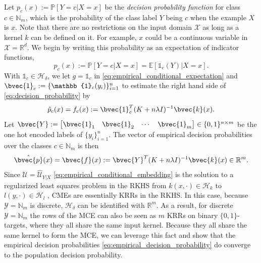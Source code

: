 \documentclass{llncs}
\begin{document}
	Let $p_{c}(x) := \mathbb{P}[Y = c | X = x]$ be the \textit{decision probability function} for class $c \in \mathbb{N}_{m}$, which is the probability of the class label $Y$ being $c$ when the example $X$ is $x$. Note that there are no restrictions on the input domain $\mathcal{X}$ as long as a kernel $k$ can be defined on it. For example, $x$ could be a continuous variable in $\mathcal{X} = \mathbb{R}^{d}$. We begin by writing this probability as an expectation of indicator functions,
	\begin{equation}
	p_{c}(x) := \mathbb{P}[Y = c | X = x] = \mathbb{E}[\mathbb{1}_{c}(Y) | X = x].
	\label{eq:decision_probability}
	\end{equation}	
	With $\mathbb{1}_{c} \in \mathcal{H}_{\delta}$, we let $g = \mathbb{1}_{c}$ in \eqref{eq:empirical_conditional_expectation} and $\bvec{1}_{c} := \{\mathbb{1}_{c}(y_{i})\}_{i = 1}^{n}$ to estimate the right hand side of \eqref{eq:decision_probability} by
	\begin{equation}
	\hat{p}_{c}(x) = f_{c}(x) := \bvec{1}_{c}^{T} (K + n \lambda I)^{-1} \bvec{k}(x).
	\label{eq:empirical_decision_probability}
	\end{equation}
	Let $\bvec{Y} := \begin{bmatrix} \bvec{1}_{1} & \bvec{1}_{2} & \cdots & \bvec{1}_{m} \end{bmatrix} \in \{0, 1\}^{n \times m}$ be the one hot encoded labels of $\{y_{i}\}_{i = 1}^{n}$. The vector of empirical decision probabilities over the classes $c \in \mathbb{N}_{m}$ is then
	\begin{equation}
	\hat{\bvec{p}}(x) = \bvec{f}(x) := \bvec{Y}^{T} (K + n \lambda I)^{-1} \bvec{k}(x) \in \mathbb{R}^{m}.
	\label{eq:empirical_decision_probability_vector}
	\end{equation}
	Since $\mathcal{U} = \hat{\mathcal{U}}_{Y | X}$ \eqref{eq:empirical_conditional_embedding} is the solution to a regularized least squares problem in the RKHS from $k(x, \cdot) \in \mathcal{H}_{k}$ to $l(y, \cdot) \in \mathcal{H}_{l}$ \citep{lever2012conditional}, \glspl{CME} are essentially \glspl{KRR} in the \gls{RKHS}. In this case, because $\mathcal{Y} = \mathbb{N}_{m}$ is discrete, $\mathcal{H}_{\delta}$ can be identified with $\mathbb{R}^{m}$. As a result, for discrete $\mathcal{Y} = \mathbb{N}_{m}$ the rows of the \gls{MCE} can also be seen as $m$ \glspl{KRR} \citep{friedman2001elements} on binary $\{0, 1\}$-targets, where they all share the same input kernel. Because they all share the same kernel to form the \gls{MCE}, we can leverage this fact and show that the empirical decision probabilities \eqref{eq:empirical_decision_probability} do converge to the population decision probability.
	
\end{document}
